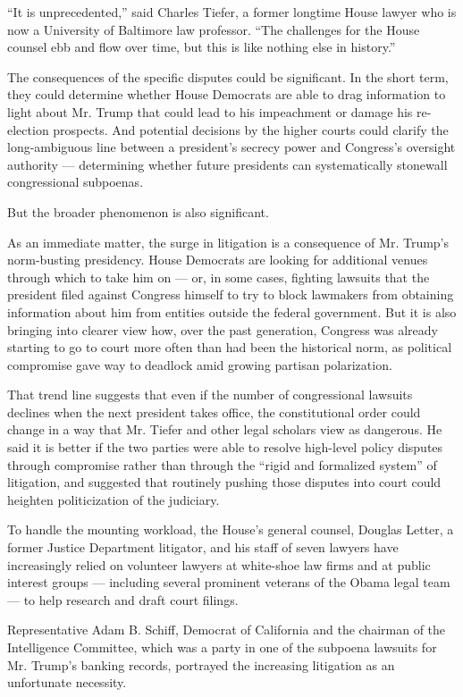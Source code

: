 ``It is unprecedented,'' said Charles Tiefer, a former longtime House
lawyer who is now a University of Baltimore law professor. ``The
challenges for the House counsel ebb and flow over time, but this is
like nothing else in history.''

The consequences of the specific disputes could be significant. In the
short term, they could determine whether House Democrats are able to
drag information to light about Mr. Trump that could lead to his
impeachment or damage his re-election prospects. And potential decisions
by the higher courts could clarify the long-ambiguous line between a
president's secrecy power and Congress's oversight authority ---
determining whether future presidents can systematically stonewall
congressional subpoenas.

But the broader phenomenon is also significant.

As an immediate matter, the surge in litigation is a consequence of Mr.
Trump's norm-busting presidency. House Democrats are looking for
additional venues through which to take him on --- or, in some cases,
fighting lawsuits that the president filed against Congress himself to
try to block lawmakers from obtaining information about him from
entities outside the federal government. But it is also bringing into
clearer view how, over the past generation, Congress was already
starting to go to court more often than had been the historical norm, as
political compromise gave way to deadlock amid growing partisan
polarization.

That trend line suggests that even if the number of congressional
lawsuits declines when the next president takes office, the
constitutional order could change in a way that Mr. Tiefer and other
legal scholars view as dangerous. He said it is better if the two
parties were able to resolve high-level policy disputes through
compromise rather than through the ``rigid and formalized system'' of
litigation, and suggested that routinely pushing those disputes into
court could heighten politicization of the judiciary.

To handle the mounting workload, the House's general counsel, Douglas
Letter, a former Justice Department litigator, and his staff of seven
lawyers have increasingly relied on volunteer lawyers at white-shoe law
firms and at public interest groups --- including several prominent
veterans of the Obama legal team --- to help research and draft court
filings.

Representative Adam B. Schiff, Democrat of California and the chairman
of the Intelligence Committee, which was a party in one of the subpoena
lawsuits for Mr. Trump's banking records, portrayed the increasing
litigation as an unfortunate necessity.


